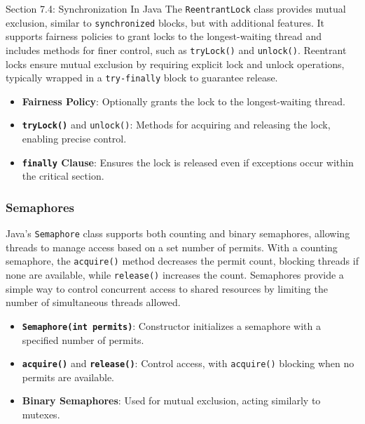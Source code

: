 \begin{notes}{Section 7.4: Synchronization In Java}
    The \texttt{ReentrantLock} class provides mutual exclusion, similar to \texttt{synchronized} blocks, but with additional features. It supports fairness policies to grant locks to the longest-waiting 
    thread and includes methods for finer control, such as \texttt{tryLock()} and \texttt{unlock()}. Reentrant locks ensure mutual exclusion by requiring explicit lock and unlock operations, typically 
    wrapped in a \texttt{try-finally} block to guarantee release.
    
    \begin{highlight}
    
        \begin{itemize}
            \item \textbf{Fairness Policy}: Optionally grants the lock to the longest-waiting thread.
            \item \textbf{\texttt{tryLock()}} and \texttt{unlock()}: Methods for acquiring and releasing the lock, enabling precise control.
            \item \textbf{\texttt{finally} Clause}: Ensures the lock is released even if exceptions occur within the critical section.
        \end{itemize}
    
    \end{highlight}
    
    \subsubsection*{Semaphores}
    
    Java's \texttt{Semaphore} class supports both counting and binary semaphores, allowing threads to manage access based on a set number of permits. With a counting semaphore, the \texttt{acquire()} 
    method decreases the permit count, blocking threads if none are available, while \texttt{release()} increases the count. Semaphores provide a simple way to control concurrent access to shared 
    resources by limiting the number of simultaneous threads allowed.
    
    \begin{highlight}[Semaphores]
    
        \begin{itemize}
            \item \textbf{\texttt{Semaphore(int permits)}}: Constructor initializes a semaphore with a specified number of permits.
            \item \textbf{\texttt{acquire()}} and \textbf{\texttt{release()}}: Control access, with \texttt{acquire()} blocking when no permits are available.
            \item \textbf{Binary Semaphores}: Used for mutual exclusion, acting similarly to mutexes.
        \end{itemize}
    

\end{highlight}
\end{notes}
